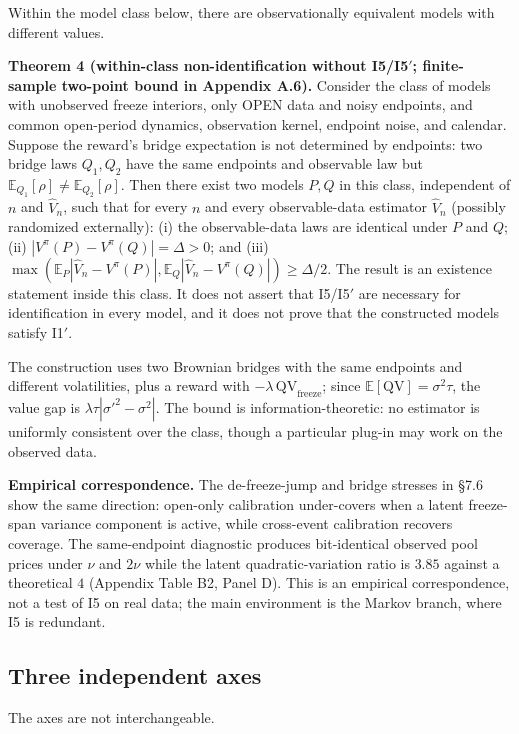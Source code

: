 Within the model class below, there are observationally equivalent models with different values.

\textbf{Theorem 4 (within-class non-identification without I5/I5$'$; finite-sample two-point bound in Appendix A.6).} Consider the class of models with unobserved freeze interiors, only OPEN data and noisy endpoints, and common open-period dynamics, observation kernel, endpoint noise, and calendar. Suppose the reward's bridge expectation is not determined by endpoints: two bridge laws $Q_1,Q_2$ have the same endpoints and observable law but $\mathbb E_{Q_1}[\rho]\ne\mathbb E_{Q_2}[\rho]$. Then there exist two models $P,Q$ in this class, independent of $n$ and $\hat V_n$, such that for every $n$ and every observable-data estimator $\hat V_n$ (possibly randomized externally): (i) the observable-data laws are identical under $P$ and $Q$; (ii) $|V^\pi(P)-V^\pi(Q)|=\Delta>0$; and (iii) $\max(\mathbb E_P|\hat V_n-V^\pi(P)|,\mathbb E_Q|\hat V_n-V^\pi(Q)|)\ge\Delta/2$. The result is an existence statement inside this class. It does not assert that I5/I5$'$ are necessary for identification in every model, and it does not prove that the constructed models satisfy I1$'$.

The construction uses two Brownian bridges with the same endpoints and different volatilities, plus a reward with $-\lambda\,\mathrm{QV}_{\mathrm{freeze}}$; since $\mathbb E[\mathrm{QV}]=\sigma^2\tau$, the value gap is $\lambda\tau|\sigma'^2-\sigma^2|$. The bound is information-theoretic: no estimator is uniformly consistent over the class, though a particular plug-in may work on the observed data.

\textbf{Empirical correspondence.} The de-freeze-jump and bridge stresses in \S7.6 show the same direction: open-only calibration under-covers when a latent freeze-span variance component is active, while cross-event calibration recovers coverage. The same-endpoint diagnostic produces bit-identical observed pool prices under $\nu$ and $2\nu$ while the latent quadratic-variation ratio is $3.85$ against a theoretical $4$ (Appendix Table B2, Panel D). This is an empirical correspondence, not a test of I5 on real data; the main environment is the Markov branch, where I5 is redundant.

\subsection{Three independent axes}

The axes are not interchangeable.

